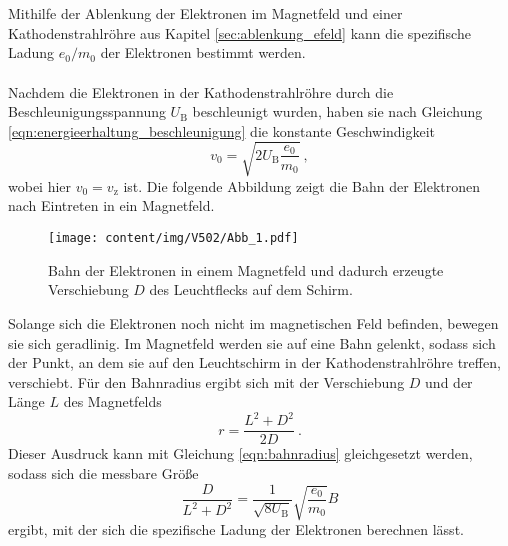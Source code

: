     \\
    \\
    Mithilfe der Ablenkung der Elektronen im Magnetfeld und einer Kathodenstrahlröhre aus Kapitel \ref{sec:ablenkung_efeld} kann die spezifische Ladung $e_0/m_0$ der Elektronen bestimmt werden.\\
    \\
    Nachdem die Elektronen in der Kathodenstrahlröhre durch die Beschleunigungsspannung $U_\text{B}$ beschleunigt wurden,
    haben sie nach Gleichung \ref{eqn:energieerhaltung_beschleunigung} die konstante Geschwindigkeit
    \begin{equation}
        v_0 = \sqrt{2 U_\text{B} \frac{e_0}{m_0}} \ ,
    \end{equation}
    wobei hier $v_0 = v_\text{z}$ ist.
    Die folgende Abbildung zeigt die Bahn der Elektronen nach Eintreten in ein Magnetfeld.
    \begin{figure}[H]
       \centering
        \texttt{[image: content/img/V502/Abb\_1.pdf]}
        \caption{Bahn der Elektronen in einem Magnetfeld und dadurch erzeugte Verschiebung $D$ des Leuchtflecks auf dem Schirm.}
        \label{fig:elektronenbahn_magnetfeld}
    \end{figure}
    Solange sich die Elektronen noch nicht im magnetischen Feld befinden,
    bewegen sie sich geradlinig.
    Im Magnetfeld werden sie auf eine Bahn gelenkt,
    sodass sich der Punkt,
    an dem sie auf den Leuchtschirm in der Kathodenstrahlröhre treffen,
    verschiebt.
    Für den Bahnradius ergibt sich mit der Verschiebung $D$ und der Länge $L$ des Magnetfelds
    \begin{equation}
        r = \frac{L^2 + D^2}{2D} \ .
    \end{equation}
    Dieser Ausdruck kann mit Gleichung \ref{eqn:bahnradius} gleichgesetzt werden,
    sodass sich die messbare Größe
    \begin{equation}
        \frac{D}{L^2 + D^2} = \frac{1}{\sqrt{8 U_\text{B}}} \sqrt{\frac{e_0}{m_0}} B
        \label{eqn:formel_verschiebung}
    \end{equation}
    ergibt,
    mit der sich die spezifische Ladung der Elektronen berechnen lässt.